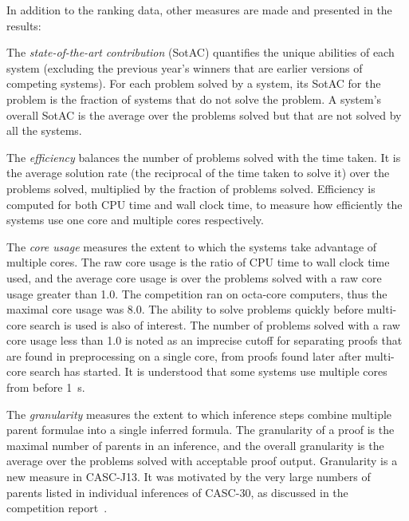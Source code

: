 \documentclass[aic]{iosart2x}
\newenvironment{packed_itemize}{
\vspace*{-0.3em}
\begin{itemize}
  \setlength{\partopsep}{0pt}
  \setlength{\itemsep}{1pt}
  \setlength{\parskip}{0pt}
  \setlength{\parsep}{0pt}
}{\end{itemize}}
\newcommand{\LAST}{\mbox{CASC-30}}
\newcommand{\THIS}{\mbox{CASC-J13}}
\begin{document}
In addition to the ranking data, other measures are made and presented in the results:
\begin{packed_itemize}
\item The \textit{state-of-the-art contribution} (SotAC) quantifies the unique abilities of each
      system (excluding the previous year's winners that are earlier versions of competing systems).
      For each problem solved by a system, its SotAC for the problem is the fraction of systems 
      that do not solve the problem.
      A system's overall SotAC is the average over the problems solved but that are not solved 
      by all the systems.
\item The \textit{efficiency} balances the number of problems solved with the time taken.
      It is the average solution rate (the reciprocal of the time taken to solve it) over the 
      problems solved, multiplied by the fraction of problems solved.
      Efficiency is computed for both CPU time and wall clock time, to measure how efficiently the
      systems use one core and multiple cores respectively.
\item The \textit{core usage} measures the extent to which the systems take advantage of multiple
      cores.
      The raw core usage is the ratio of CPU time to wall clock time used, and the average core
      usage is over the problems solved with a raw core usage greater than 1.0.
      The competition ran on octa-core computers, thus the maximal core usage was 8.0.
      The ability to solve problems quickly before multi-core search is used is also of interest.
      The number of problems solved with a raw core usage less than 1.0 is noted as an imprecise
      cutoff for separating proofs that are found in preprocessing on a single core, from proofs
      found later after multi-core search has started. 
      It is understood that some systems use multiple cores from before 1~s.
\item The \textit{granularity} measures the extent to which inference steps combine multiple 
      parent formulae into a single inferred formula.
      The granularity of a proof is the maximal number of parents in an inference, and the 
      overall granularity is the average over the problems solved with acceptable proof output.
      Granularity is a new measure in \THIS{}. 
      It was motivated by the very large numbers of parents listed in individual inferences of 
      \LAST{}, as discussed in the competition report~\cite{Sut26-CASC}.
\end{packed_itemize}
\end{document}
